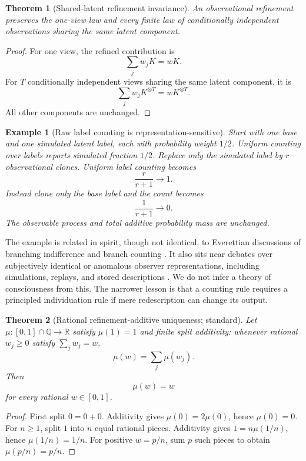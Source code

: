 \documentclass[11pt]{article}
\newtheorem{theorem}{Theorem}
\newtheorem{example}{Example}
\begin{document}
\begin{theorem}[Shared-latent refinement invariance]\label{thm:clone}
An observational refinement preserves the one-view law and every finite law of conditionally independent observations sharing the same latent component.
\end{theorem}

\begin{proof}
For one view, the refined contribution is
\[
\sum_j w_jK=wK.
\]
For $T$ conditionally independent views sharing the same latent component, it is
\[
\sum_jw_jK^{\otimes T}=wK^{\otimes T}.
\]
All other components are unchanged.
\end{proof}

\begin{example}[Raw label counting is representation-sensitive]\label{ex:clone}
Start with one base and one simulated latent label, each with probability weight $1/2$. Uniform counting over labels reports simulated fraction $1/2$. Replace only the simulated label by $r$ observational clones. Uniform label counting becomes
\[
\frac{r}{r+1}\to1.
\]
Instead clone only the base label and the count becomes
\[
\frac{1}{r+1}\to0.
\]
The observable process and total additive probability mass are unchanged.
\end{example}

The example is related in spirit, though not identical, to Everettian discussions of branching indifference and branch counting \citep{wilson2013,dizadji2015,khawaja2026}. It also sits near debates over subjectively identical or anomalous observer representations, including simulations, replays, and stored descriptions \citep{schneiderolum2013}. We do not infer a theory of consciousness from this. The narrower lesson is that a counting rule requires a principled individuation rule if mere redescription can change its output.

\begin{theorem}[Rational refinement-additive uniqueness; standard]\label{thm:add}
Let $\mu:[0,1]\cap\mathbb Q\to\mathbb R$ satisfy $\mu(1)=1$ and finite split additivity: whenever rational $w_j\ge0$ satisfy $\sum_jw_j=w$,
\[
\mu(w)=\sum_j\mu(w_j).
\]
Then
\[
\mu(w)=w
\]
for every rational $w\in[0,1]$.
\end{theorem}

\begin{proof}
First split $0=0+0$. Additivity gives $\mu(0)=2\mu(0)$, hence $\mu(0)=0$. For $n\ge1$, split $1$ into $n$ equal rational pieces. Additivity gives $1=n\mu(1/n)$, hence $\mu(1/n)=1/n$. For positive $w=p/n$, sum $p$ such pieces to obtain $\mu(p/n)=p/n$.
\end{proof}
\end{document}
